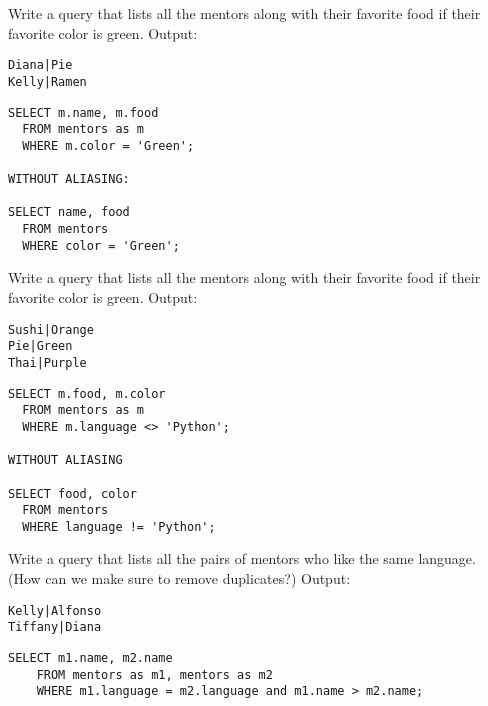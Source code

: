 \documentclass{exam}
\begin{document}
\begin{questions}
\begin{blocksection}
\question Write a query that lists all the mentors along with their favorite food if their favorite color is green.\newline
Output: 
\begin{lstlisting}
Diana|Pie 
Kelly|Ramen
\end{lstlisting}
\begin{solution}[1in]
\begin{lstlisting}
SELECT m.name, m.food
  FROM mentors as m
  WHERE m.color = 'Green';
  
WITHOUT ALIASING: 

SELECT name, food
  FROM mentors
  WHERE color = 'Green';
\end{lstlisting}
\end{solution}

\question Write a query that lists all the mentors along with their favorite food if their favorite color is green.\newline
Output: 
\begin{lstlisting}
Sushi|Orange
Pie|Green
Thai|Purple
\end{lstlisting}
\begin{solution}[1in]
\begin{lstlisting}
SELECT m.food, m.color
  FROM mentors as m
  WHERE m.language <> 'Python';

WITHOUT ALIASING

SELECT food, color
  FROM mentors
  WHERE language != 'Python';
\end{lstlisting}
\end{solution}
\end{blocksection}

\begin{blocksection}
\question Write a query that lists all the pairs of mentors who like the same language. (How can we make sure to remove duplicates?) \newline
Output:
\begin{lstlisting}
Kelly|Alfonso
Tiffany|Diana
\end{lstlisting}
\begin{solution}[2in]
\begin{lstlisting}
SELECT m1.name, m2.name 
    FROM mentors as m1, mentors as m2 
    WHERE m1.language = m2.language and m1.name > m2.name;
\end{lstlisting}
\end{solution}


\end{blocksection}
\end{questions}
\end{document}
